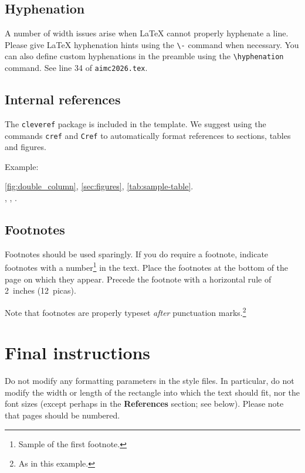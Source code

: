 \documentclass{aimc2026}
\begin{document}
\subsection{Hyphenation}
\label{sec:hyphenation}

A number of width issues arise when \LaTeX{} cannot properly hyphenate a line. Please give LaTeX hyphenation hints using the \texttt{\textbackslash -} command when necessary.
You can also define custom hyphenations in the preamble using the \texttt{\textbackslash hyphenation} command.
See line 34 of \texttt{aimc2026.tex}.

\subsection{Internal references}
\label{sec:references}

The \texttt{cleveref} package is included in the template.
We suggest using the commands \texttt{cref} and \texttt{Cref} to automatically format references to sections, tables and figures.

Example:

\cref{fig:double_column}, \cref{sec:figures}, \cref{tab:sample-table}. \\
, , .


\subsection{Footnotes}
\label{sec:footnotes}

Footnotes should be used sparingly.  If you do require a footnote, indicate
footnotes with a number\footnote{Sample of the first footnote.} in the
text. Place the footnotes at the bottom of the page on which they appear.
Precede the footnote with a horizontal rule of 2~inches (12~picas).

Note that footnotes are properly typeset \emph{after} punctuation
marks.\footnote{As in this example.}

\section{Final instructions}
\label{sec:final_instructions}

Do not modify any formatting parameters in the style files.  In
particular, do not modify the width or length of the rectangle into which the text should fit, nor the font sizes (except perhaps in the \textbf{References} section; see below). Please note that pages should be numbered.
\end{document}
